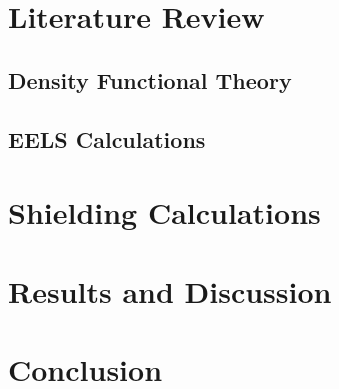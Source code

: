\documentclass[12pt]{report}
\begin{document}
\chapter{Literature Review}\label{literature_review}

\section{Density Functional Theory}\label{dft_section}

\section{EELS Calculations}\label{ELNES_section}

\chapter{Shielding Calculations}\label{methods}

\chapter{Results and Discussion}\label{results}

\chapter{Conclusion}\label{conclusion}






\newpage
\chapter{}\label{Bibliography}




\end{document}
